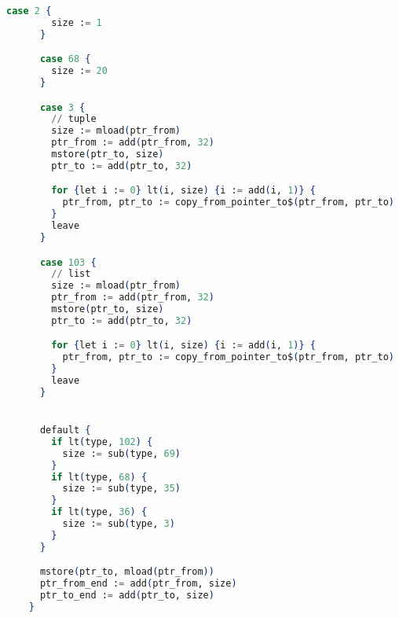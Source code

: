 \begin{lstlisting}[language=elixir]
      case 2 {
        size := 1
      }

      case 68 {
        size := 20
      }

      case 3 {
        // tuple
        size := mload(ptr_from)
        ptr_from := add(ptr_from, 32)
        mstore(ptr_to, size)
        ptr_to := add(ptr_to, 32)

        for {let i := 0} lt(i, size) {i := add(i, 1)} {
          ptr_from, ptr_to := copy_from_pointer_to$(ptr_from, ptr_to)
        }
        leave
      }

      case 103 {
        // list
        size := mload(ptr_from)
        ptr_from := add(ptr_from, 32)
        mstore(ptr_to, size)
        ptr_to := add(ptr_to, 32)

        for {let i := 0} lt(i, size) {i := add(i, 1)} {
          ptr_from, ptr_to := copy_from_pointer_to$(ptr_from, ptr_to)
        }
        leave
      }


      default {
        if lt(type, 102) {
          size := sub(type, 69)
        }
        if lt(type, 68) {
          size := sub(type, 35)
        }
        if lt(type, 36) {
          size := sub(type, 3)
        }
      }

      mstore(ptr_to, mload(ptr_from))
      ptr_from_end := add(ptr_from, size)
      ptr_to_end := add(ptr_to, size)
    }
  \end{lstlisting}
    